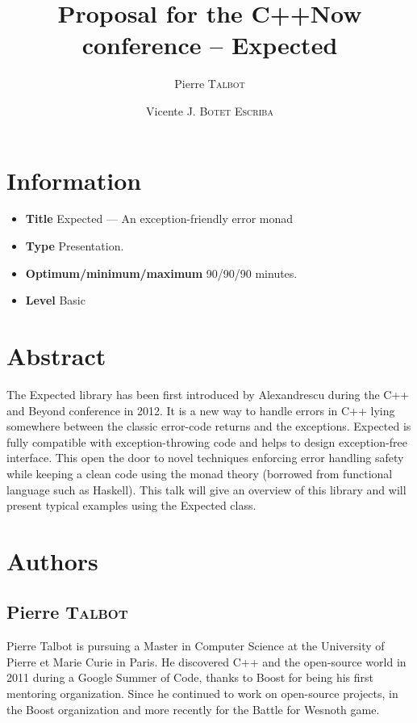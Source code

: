 \documentclass[a4paper,10pt]{article}
\title{Proposal for the C++Now conference – Expected}
\author{Pierre T\textsc{albot} \and Vicente J. B\textsc{otet} E\textsc{scriba}}
\begin{document}
\maketitle
\section{Information}

\begin{itemize}
\item \textbf{Title} Expected — An exception-friendly error monad
\item \textbf{Type} Presentation.
\item \textbf{Optimum/minimum/maximum} 90/90/90 minutes.
\item \textbf{Level} Basic
\end{itemize}

\section{Abstract}

The Expected library has been first introduced by Alexandrescu during the C++ and Beyond conference in 2012\cite{AlexandrescuExpected}. It is a new way to handle errors in C++ lying somewhere between the classic error-code returns and the exceptions. Expected is fully compatible with exception-throwing code and helps to design exception-free interface. This open the door to novel techniques enforcing error handling safety while keeping a clean code using the monad theory (borrowed from functional language such as Haskell). This talk will give an overview of this library and will present typical examples using the Expected class.

\section{Authors}

\subsection{Pierre T\textsc{albot}}

Pierre Talbot is pursuing a Master in Computer Science at the University of Pierre et Marie Curie in Paris. He discovered C++ and the open-source world in 2011 during a Google Summer of Code, thanks to Boost for being his first mentoring organization. Since he continued to work on open-source projects, in the Boost organization and more recently for the Battle for Wesnoth game.
\end{document}
